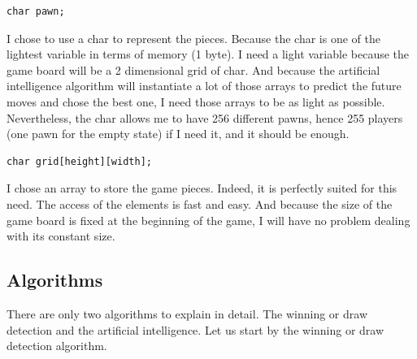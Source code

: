 \documentclass[10pt, a4paper]{article}
\begin{document}
\begin{lstlisting}[caption = Piece]
char pawn;
\end{lstlisting}
I chose to use a char to represent the pieces. Because the char is one of the lightest variable in terms of memory (1 byte). I need a light variable because the game board will be a 2 dimensional grid of char. And because the artificial intelligence algorithm will instantiate a lot of those arrays to predict the future moves and chose the best one, I need those arrays to be as light as possible. Nevertheless, the char allows me to have 256 different pawns, hence 255 players (one pawn for the empty state) if I need it, and it should be enough.

\begin{lstlisting}[caption = Game Board]
char grid[height][width];
\end{lstlisting}

I chose an array to store the game pieces. Indeed, it is perfectly suited for this need. The access of the elements is fast and easy. And because the size of the game board is fixed at the beginning of the game, I will have no problem dealing with its constant size.

\subsection{Algorithms}
There are only two algorithms to explain in detail. The winning or draw detection and the artificial intelligence. Let us start by the winning or draw detection algorithm.
\end{document}

